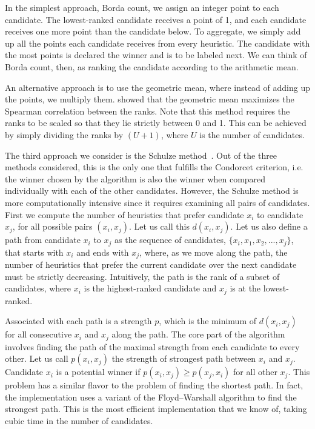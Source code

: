 \documentclass[fleqn,10pt,lineno]{wlpeerj} %
\begin{document}
In the simplest approach, Borda count, we assign an integer point to each
candidate. The lowest-ranked candidate receives a point of 1, and each
candidate receives one more point than the candidate below. To aggregate, we
simply add up all the points each candidate receives from every heuristic. The
candidate with the most points is declared the winner and is to be labeled
next. We can think of Borda count, then, as ranking the candidate according to
the arithmetic mean.

An alternative approach is to use the geometric mean, where instead of adding
up the points, we multiply them. \cite{bedo14} showed that the geometric mean
maximizes the Spearman correlation between the ranks. Note that this method
requires the ranks to be scaled so that they lie strictly between 0 and 1. This
can be achieved by simply dividing the ranks by $(U + 1)$, where $U$ is the
number of candidates.

The third approach we consider is the Schulze method~\citep{schulze11}. Out of
the three methods considered, this is the only one that fulfills the Condorcet
criterion, i.e. the winner chosen by the algorithm is also the winner when
compared individually with each of the other candidates. However, the Schulze
method is more computationally intensive since it requires examining all pairs
of candidates. First we compute the number of heuristics that prefer candidate
$x_i$ to candidate $x_j$, for all possible pairs $(x_i, x_j)$. Let us call this
$d(x_i, x_j)$. Let us also define a path from candidate $x_i$ to $x_j$ as the
sequence of candidates, $\{ x_i, x_1, x_2,... ,x_j \}$, that starts with $x_i$
and ends with $x_j$, where, as we move along the path, the number of heuristics
that prefer the current candidate over the next candidate must be strictly
decreasing. Intuitively, the path is the rank of a subset of candidates, where
$x_i$ is the highest-ranked candidate and $x_j$ is at the lowest-ranked.

Associated with each path is a strength $p$, which is the minimum of $d(x_i,
x_j)$ for all consecutive $x_i$ and $x_j$ along the path. The core part of the
algorithm involves finding the path of the maximal strength from each
candidate to every other. Let us call $p(x_i, x_j)$ the strength of strongest
path between $x_i$ and $x_j$. Candidate $x_i$ is a potential winner if $p(x_i,
x_j) \geq p(x_j, x_i)$ for all other $x_j$. This problem has a similar flavor
to the problem of finding the shortest path. In fact, the implementation uses a
variant of the Floyd–Warshall algorithm to find the strongest path. This is the
most efficient implementation that we know of, taking cubic time in the number
of candidates.
\end{document}
